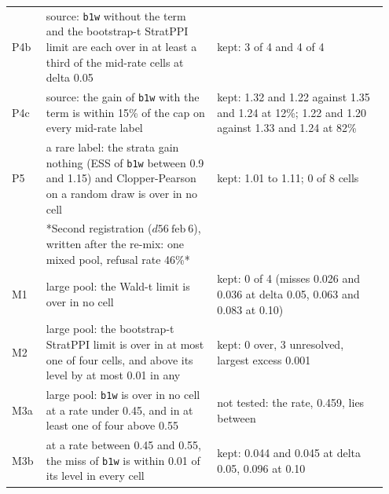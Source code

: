 \documentclass[11pt]{article}
\begin{document}
\begin{longtable}{@{}>{\raggedright\arraybackslash}p{0.087\linewidth}>{\raggedright\arraybackslash}p{0.430\linewidth}>{\raggedright\arraybackslash}p{0.430\linewidth}@{}}
\hspace{0pt}P4b & \hspace{0pt}source: \texttt{b1w} without the term and the bootstrap-t StratPPI limit are each over in at least a third of the mid-rate cells at delta 0.05 & \hspace{0pt}kept: 3 of 4 and 4 of 4 \\
\hspace{0pt}P4c & \hspace{0pt}source: the gain of \texttt{b1w} with the term is within 15\% of the cap on every mid-rate label & \hspace{0pt}kept: 1.32 and 1.22 against 1.35 and 1.24 at 12\%; 1.22 and 1.20 against 1.33 and 1.24 at 82\% \\
\hspace{0pt}P5 & \hspace{0pt}a rare label: the strata gain nothing (ESS of \texttt{b1w} between 0.9 and 1.15) and Clopper-Pearson on a random draw is over in no cell & \hspace{0pt}kept: 1.01 to 1.11; 0 of 8 cells \\
 & \hspace{0pt}*Second registration ($d 56\ \text{feb}\ 6$), written after the re-mix: one mixed pool, refusal rate 46\%* &  \\
\hspace{0pt}M1 & \hspace{0pt}large pool: the Wald-t limit is over in no cell & \hspace{0pt}kept: 0 of 4 (misses 0.026 and 0.036 at delta 0.05, 0.063 and 0.083 at 0.10) \\
\hspace{0pt}M2 & \hspace{0pt}large pool: the bootstrap-t StratPPI limit is over in at most one of four cells, and above its level by at most 0.01 in any & \hspace{0pt}kept: 0 over, 3 unresolved, largest excess 0.001 \\
\hspace{0pt}M3a & \hspace{0pt}large pool: \texttt{b1w} is over in no cell at a rate under 0.45, and in at least one of four above 0.55 & \hspace{0pt}not tested: the rate, 0.459, lies between \\
\hspace{0pt}M3b & \hspace{0pt}at a rate between 0.45 and 0.55, the miss of \texttt{b1w} is within 0.01 of its level in every cell & \hspace{0pt}kept: 0.044 and 0.045 at delta 0.05, 0.096 at 0.10 \\

\end{longtable}
\end{document}
